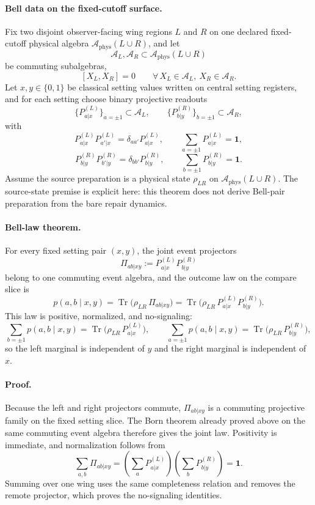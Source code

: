 \documentclass[11pt]{article}
\begin{document}
\paragraph{Bell data on the fixed-cutoff surface.}
Fix two disjoint observer-facing wing regions \(L\) and \(R\) on one declared fixed-cutoff
physical algebra \(\mathcal A_{\mathrm{phys}}(L\cup R)\), and let
\[
\mathcal A_L,\mathcal A_R\subset \mathcal A_{\mathrm{phys}}(L\cup R)
\]
be commuting subalgebras,
\[
[X_L,X_R]=0
\qquad
\forall\, X_L\in\mathcal A_L,\ X_R\in\mathcal A_R.
\]
Let \(x,y\in\{0,1\}\) be classical setting values written on central setting registers, and for
each setting choose binary projective readouts
\[
\{P_{a|x}^{(L)}\}_{a=\pm1}\subset\mathcal A_L,
\qquad
\{P_{b|y}^{(R)}\}_{b=\pm1}\subset\mathcal A_R,
\]
with
\[
P_{a|x}^{(L)}P_{a'|x}^{(L)}=\delta_{aa'}P_{a|x}^{(L)},
\qquad
\sum_{a=\pm1}P_{a|x}^{(L)}=\mathbf 1,
\]
\[
P_{b|y}^{(R)}P_{b'|y}^{(R)}=\delta_{bb'}P_{b|y}^{(R)},
\qquad
\sum_{b=\pm1}P_{b|y}^{(R)}=\mathbf 1.
\]
Assume the source preparation is a physical state \(\rho_{LR}\) on
\(\mathcal A_{\mathrm{phys}}(L\cup R)\). The source-state premise is explicit here: this theorem
does not derive Bell-pair preparation from the bare repair dynamics.

\paragraph{Bell-law theorem.}
For every fixed setting pair \((x,y)\), the joint event projectors
\[
\Pi_{ab|xy}:=P_{a|x}^{(L)}P_{b|y}^{(R)}
\]
belong to one commuting event algebra, and the outcome law on the compare slice is
\begin{equation}
p(a,b\mid x,y)
=
\operatorname{Tr}\!\bigl(\rho_{LR}\,\Pi_{ab|xy}\bigr)
=
\operatorname{Tr}\!\bigl(\rho_{LR}\,P_{a|x}^{(L)}P_{b|y}^{(R)}\bigr).
\end{equation}
This law is positive, normalized, and no-signaling:
\begin{equation}
\sum_{b=\pm1} p(a,b\mid x,y)
=
\operatorname{Tr}\!\bigl(\rho_{LR}\,P_{a|x}^{(L)}\bigr),
\qquad
\sum_{a=\pm1} p(a,b\mid x,y)
=
\operatorname{Tr}\!\bigl(\rho_{LR}\,P_{b|y}^{(R)}\bigr),
\end{equation}
so the left marginal is independent of \(y\) and the right marginal is independent of \(x\).

\paragraph{Proof.}
Because the left and right projectors commute, \(\Pi_{ab|xy}\) is a commuting projective family on
the fixed setting slice. The Born theorem already proved above on the same commuting event algebra
therefore gives the joint law. Positivity is immediate, and normalization follows from
\[
\sum_{a,b}\Pi_{ab|xy}
=
\left(\sum_a P_{a|x}^{(L)}\right)\left(\sum_b P_{b|y}^{(R)}\right)
=
\mathbf 1.
\]
Summing over one wing uses the same completeness relation and removes the remote projector, which
proves the no-signaling identities.
\end{document}
